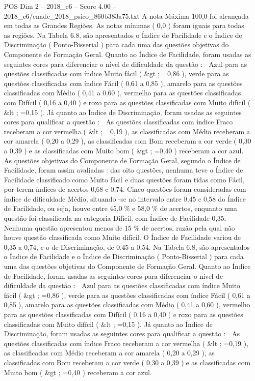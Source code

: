 \begin{textsample}{POS Dim 2 – 2018\_c6 – Score 4.00 – 2018\_c6/enade\_2018\_psico\_860b383a75.txt}
A nota Máxima 100,0 foi alcançada em todas as Grandes Regiões.
As notas mínimas ( 0,0 ) foram iguais para todas as regiões.
Na Tabela 6.8, são apresentados o Índice de Facilidade e o Índice de Discriminação ( Ponto-Bisserial ) para cada uma das questões objetivas do Componente de Formação Geral.
Quanto ao Índice de Facilidade, foram usadas as seguintes cores para diferenciar o nível de dificuldade da questão :  Azul para as questões classificadas com índice Muito fácil ( \&gt ; =0,86 ), verde para as questões classificadas com índice Fácil ( 0,61 a 0,85 ), amarelo para as questões classificadas com Médio ( 0,41 a 0,60 ), vermelho para as questões classificadas com Difícil ( 0,16 a 0,40 ) e roxo para as questões classificadas com Muito difícil ( \&lt ; =0,15 ).
Já quanto ao Índice de Discriminação, foram usadas as seguintes cores para qualificar a questão :  As questões classificadas com índice Fraco receberam a cor vermelha ( \&lt ; =0,19 ), as classificadas com Médio receberam a cor amarela ( 0,20 a 0,29 ), as classificadas com Bom receberam a cor verde ( 0,30 a 0,39 ) e as classificadas com Muito bom ( \&gt ; =0,40 ) receberam a cor azul.
As questões objetivas do Componente de Formação Geral, segundo o Índice de Facilidade, foram assim avaliadas : das oito questões, nenhuma teve o Índice de Facilidade classificado como Muito fácil e duas questões foram tidas como Fácil, por terem índices de acertos 0,68 e 0,74.
Cinco questões foram consideradas com índice de dificuldade Médio, situando -se no intervalo entre 0,45 e 0,58 do Índice de Facilidade, ou seja, houve entre 45,0 \% e 58,0 \% de acertos, enquanto uma questão foi classificada na categoria Difícil, com Índice de Facilidade 0,35.
Nenhuma questão apresentou menos de 15 \% de acertos, razão pela qual não houve questão classificada como Muito difícil.
O Índice de Facilidade variou de 0,35 a 0,74, e o de Discriminação, de 0,45 a 0,54.
Na Tabela 6.8, são apresentados o Índice de Facilidade e o Índice de Discriminação ( Ponto-Bisserial ) para cada uma das questões objetivas do Componente de Formação Geral.
Quanto ao Índice de Facilidade, foram usadas as seguintes cores para diferenciar o nível de dificuldade da questão :  Azul para as questões classificadas com índice Muito fácil ( \&gt ; =0,86 ), verde para as questões classificadas com índice Fácil ( 0,61 a 0,85 ), amarelo para as questões classificadas com Médio ( 0,41 a 0,60 ), vermelho para as questões classificadas com Difícil ( 0,16 a 0,40 ) e roxo para as questões classificadas com Muito difícil ( \&lt ; =0,15 ).
Já quanto ao Índice de Discriminação, foram usadas as seguintes cores para qualificar a questão :  As questões classificadas com índice Fraco receberam a cor vermelha ( \&lt ; =0,19 ), as classificadas com Médio receberam a cor amarela ( 0,20 a 0,29 ), as classificadas com Bom receberam a cor verde ( 0,30 a 0,39 ) e as classificadas com Muito bom ( \&gt ; =0,40 ) receberam a cor azul.

\end{textsample}
